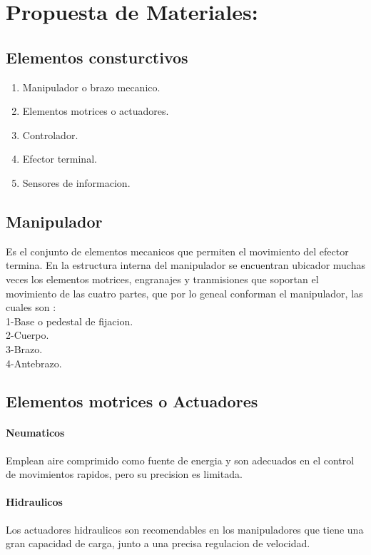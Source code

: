 \documentclass[14pt,a4paper]{article}
\begin{document}
\section{Propuesta de Materiales:}

\subsection{Elementos consturctivos}
\begin{enumerate}

\item Manipulador o brazo mecanico.\\
\item Elementos motrices o actuadores.\\
\item Controlador.\\
\item Efector terminal.\\
\item Sensores de informacion.
\end{enumerate}

\subsection{Manipulador}
Es el conjunto de elementos mecanicos que permiten el movimiento del efector termina. En la estructura interna del manipulador se encuentran ubicador muchas veces los elementos motrices, engranajes y tranmisiones que soportan el movimiento de las cuatro partes, que por lo geneal conforman el manipulador, las cuales son \citep{puglisi2006protesis}:\\
1-Base o pedestal de fijacion.\\
2-Cuerpo.\\
3-Brazo.\\
4-Antebrazo.\\
\subsection{Elementos motrices o Actuadores}
\paragraph{Neumaticos}
Emplean aire comprimido como fuente de energia y son adecuados en el control de movimientos rapidos, pero su precision es limitada.
\paragraph{Hidraulicos}
Los actuadores hidraulicos son recomendables en los manipuladores que tiene una gran capacidad de carga, junto a una precisa regulacion de velocidad.
\end{document}

